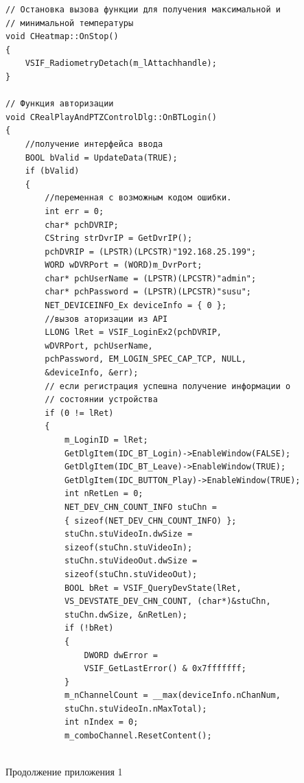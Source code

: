 \documentclass[14pt, a4paper]{extreport}
\begin{document}
\begin{Verbatim}[fontseries=c, fontsize=\fontsize{10pt}{12pt}\selectfont]
// Остановка вызова функции для получения максимальной и 
// минимальной температуры
void CHeatmap::OnStop()
{
	VSIF_RadiometryDetach(m_lAttachhandle);
}

// Функция авторизации 
void CRealPlayAndPTZControlDlg::OnBTLogin()
{
	//получение интерфейса ввода
	BOOL bValid = UpdateData(TRUE);	
	if (bValid)
	{
		//переменная с возможным кодом ошибки.
		int err = 0;	
		char* pchDVRIP;
		CString strDvrIP = GetDvrIP();
		pchDVRIP = (LPSTR)(LPCSTR)"192.168.25.199";
		WORD wDVRPort = (WORD)m_DvrPort;
		char* pchUserName = (LPSTR)(LPCSTR)"admin";
		char* pchPassword = (LPSTR)(LPCSTR)"susu";
		NET_DEVICEINFO_Ex deviceInfo = { 0 };
		//вызов аторизации из API 
		LLONG lRet = VSIF_LoginEx2(pchDVRIP, 
		wDVRPort, pchUserName,
		pchPassword, EM_LOGIN_SPEC_CAP_TCP, NULL,
		&deviceInfo, &err);
		// если регистрация успешна получение информации о
		// состоянии устройства
		if (0 != lRet)
		{
			m_LoginID = lRet;
			GetDlgItem(IDC_BT_Login)->EnableWindow(FALSE);
			GetDlgItem(IDC_BT_Leave)->EnableWindow(TRUE);
			GetDlgItem(IDC_BUTTON_Play)->EnableWindow(TRUE);
			int nRetLen = 0;
			NET_DEV_CHN_COUNT_INFO stuChn = 
			{ sizeof(NET_DEV_CHN_COUNT_INFO) };
			stuChn.stuVideoIn.dwSize = 
			sizeof(stuChn.stuVideoIn);
			stuChn.stuVideoOut.dwSize = 
			sizeof(stuChn.stuVideoOut);
			BOOL bRet = VSIF_QueryDevState(lRet, 
			VS_DEVSTATE_DEV_CHN_COUNT, (char*)&stuChn, 
			stuChn.dwSize, &nRetLen);
			if (!bRet)
			{
				DWORD dwError = 
				VSIF_GetLastError() & 0x7fffffff;
			}
			m_nChannelCount = __max(deviceInfo.nChanNum, 
			stuChn.stuVideoIn.nMaxTotal);
			int nIndex = 0;
			m_comboChannel.ResetContent();
			
\end{Verbatim}
\noindent Продолжение приложения 1
\end{document}

